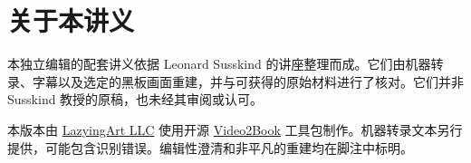 \documentclass[11pt,oneside]{book}
\begin{document}
\frontmatter
\hypersetup{pageanchor=false}

\hypersetup{pageanchor=true}

\clearpage
\chapter*{关于本讲义}
本独立编辑的配套讲义依据 Leonard Susskind 的讲座整理而成。它们由机器转录、字幕以及选定的黑板画面重建，并与可获得的原始材料进行了核对。它们并非 Susskind 教授的原稿，也未经其审阅或认可。

本版本由 \href{https://lazying.art}{LazyingArt LLC} 使用开源 \href{https://github.com/lachlanchen/Video2Book}{Video2Book} 工具包制作。机器转录文本另行提供，可能包含识别错误。编辑性澄清和非平凡的重建均在脚注中标明。
\clearpage
\tableofcontents
\mainmatter









\end{document}
